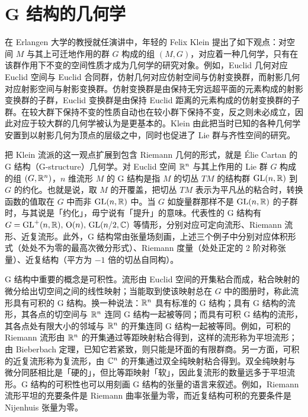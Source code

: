 \chapter{G 结构的几何学}

在 Erlangen 大学的教授就任演讲中，年轻的 Felix Klein 提出了如下观点：对空间 $M$ 与其上可迁地作用的群 $G$ 构成的组 $(M,G)$，对应着一种几何学，只有在该群作用下不变的空间性质才成为几何学的研究对象。例如，Euclid 几何对应 Euclid 空间与 Euclid 合同群，仿射几何对应仿射空间与仿射变换群，而射影几何对应射影空间与射影变换群。仿射变换群是由保持无穷远超平面的元素构成的射影变换群的子群，Euclid 变换群是由保持 Euclid 距离的元素构成的仿射变换群的子群。在较大群下保持不变的性质自动也在较小群下保持不变，反之则未必成立，因此对应于较大群的几何学被认为是更基本的。Klein 由此把当时已知的各种几何学安置到以射影几何为顶点的层级之中，同时也促进了 Lie 群与齐性空间的研究。

把 Klein 流派的这一观点扩展到包含 Riemann 几何的形式，就是 Élie Cartan 的 G 结构（G-structure）几何学。对 Euclid 空间 $\mathbb{R}^n$ 与其上作用的 Lie 群 $G$ 构成的组 $(G,\mathbb{R}^n)$，$n$ 维流形 $M$ 的 G 结构是指 $M$ 的切丛 $TM$ 的结构群 $\operatorname{GL}(n,\mathbb{R})$ 到 $G$ 的约化。也就是说，取 $M$ 的开覆盖，把切丛 $TM$ 表示为平凡丛的粘合时，转换函数的值取在 $G$ 中而非 $\operatorname{GL}(n,\mathbb{R})$ 中。当 $G$ 如旋量群那样不是 $\operatorname{GL}(n,\mathbb{R})$ 的子群时，与其说是「约化」，毋宁说有「提升」的意味。代表性的 G 结构有 $G=\operatorname{GL}^{+}(n,\mathbb{R}),\,\operatorname{O}(n),\,\operatorname{GL}(n/2,\mathbb{C})$ 等情形，分别对应可定向流形、Riemann 流形、近复流形。此外，G 结构常由张量场刻画，上述三个例子中分别对应体积形式（处处不为零的最高次微分形式）、Riemann 度量（处处正定的 2 阶对称张量）、近复结构（平方为 $-1$ 倍的切丛自同构）。

G 结构中重要的概念是可积性。流形由 Euclid 空间的开集粘合而成，粘合映射的微分给出切空间之间的线性映射；当能取到使该映射总在 $G$ 中的图册时，称此流形具有可积的 G 结构。换一种说法：$\mathbb{R}^n$ 具有标准的 G 结构；具有 G 结构的流形，其各点的切空间与 $\mathbb{R}^n$ 连同 G 结构一起被等同；而具有可积 G 结构的流形，其各点处有限大小的邻域与 $\mathbb{R}^n$ 的开集连同 G 结构一起被等同。例如，可积的 Riemann 流形由 $\mathbb{R}^n$ 的开集通过等距映射粘合得到，这样的流形称为平坦流形；由 Bieberbach 定理，已知它若紧致，则只能是环面的有限群商。另一方面，可积的近复流形称为复流形，由 $\mathbb{C}^n$ 的开集通过双全纯映射粘合得到。双全纯映射与微分同胚相比是「硬的」，但比等距映射「软」，因此复流形的数量远多于平坦流形。G 结构的可积性也可以用刻画 G 结构的张量的语言来叙述。例如，Riemann 流形平坦的充要条件是 Riemann 曲率张量为零，而近复结构可积的充要条件是 Nijenhuis 张量为零。

